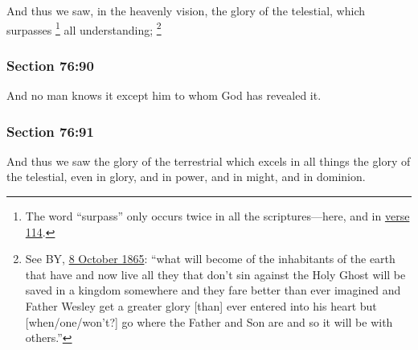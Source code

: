 		And thus we saw, in the heavenly vision, the glory of the telestial, which surpasses%
		\footnote{%
			The word ``surpass'' only occurs twice in all the scriptures---here, and in \hyperref[DC76-114]{verse 114}.
			} 
		all understanding;%
			\footnote{%
				See BY, \hyperref[EMS-1865-BY-8-OCT-1865]{8 October 1865}: ``what will become of the inhabitants of the earth that have and now live all they that don’t sin against the Holy Ghost will be saved in a kingdom somewhere and they fare better than ever imagined and Father Wesley get a greater glory [than] ever entered into his heart but [when/one/won't?] go where the Father and Son are and so it will be with others.''
				}


	\subsubsection{Section 76:90} %
		\label{DC76-90}

		And no man knows it except him to whom God has revealed it.


	\subsubsection{Section 76:91} %
		\label{DC76-91}

		And thus we saw the glory of the terrestrial which excels in all things the glory of the telestial, even in glory, and in power, and in might, and in dominion.


